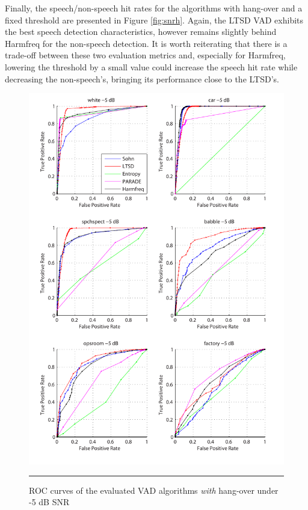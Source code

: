 Finally, the speech/non-speech hit rates for the algorithms with hang-over and a fixed threshold are presented in Figure \ref{fig:snrh}. Again, the LTSD VAD exhibits the best speech detection characteristics, however remains slightly behind Harmfreq for the non-speech detection. It is worth reiterating that there is a trade-off between these two evaluation metrics and, especially for Harmfreq, lowering the threshold by a small value could increase the speech hit rate while decreasing the non-speech's, bringing its performance close to the LTSD's.

\begin{figure}[htbp]
	\centering
		\includegraphics[width=1.0\columnwidth]{Figures/Chapter4/-5dBh.pdf}
		\rule{37em}{0.5pt}
	\caption[ROC curves of the evaluated algorithms \emph{with} hang-over under -5 dB SNR]{ROC curves of the evaluated VAD algorithms \emph{with} hang-over under -5 dB SNR}
	\label{fig:-5dBh}
\end{figure}

